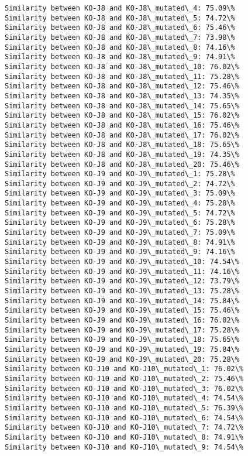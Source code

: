 \documentclass[11pt]{article}
\begin{document}
\begin{Verbatim}[commandchars=\\\{\}]
Similarity between KO-J8 and KO-J8\_mutated\_4: 75.09\%
Similarity between KO-J8 and KO-J8\_mutated\_5: 74.72\%
Similarity between KO-J8 and KO-J8\_mutated\_6: 75.46\%
Similarity between KO-J8 and KO-J8\_mutated\_7: 73.98\%
Similarity between KO-J8 and KO-J8\_mutated\_8: 74.16\%
Similarity between KO-J8 and KO-J8\_mutated\_9: 74.91\%
Similarity between KO-J8 and KO-J8\_mutated\_10: 76.02\%
Similarity between KO-J8 and KO-J8\_mutated\_11: 75.28\%
Similarity between KO-J8 and KO-J8\_mutated\_12: 75.46\%
Similarity between KO-J8 and KO-J8\_mutated\_13: 74.35\%
Similarity between KO-J8 and KO-J8\_mutated\_14: 75.65\%
Similarity between KO-J8 and KO-J8\_mutated\_15: 76.02\%
Similarity between KO-J8 and KO-J8\_mutated\_16: 75.46\%
Similarity between KO-J8 and KO-J8\_mutated\_17: 76.02\%
Similarity between KO-J8 and KO-J8\_mutated\_18: 75.65\%
Similarity between KO-J8 and KO-J8\_mutated\_19: 74.35\%
Similarity between KO-J8 and KO-J8\_mutated\_20: 75.46\%
Similarity between KO-J9 and KO-J9\_mutated\_1: 75.28\%
Similarity between KO-J9 and KO-J9\_mutated\_2: 74.72\%
Similarity between KO-J9 and KO-J9\_mutated\_3: 75.09\%
Similarity between KO-J9 and KO-J9\_mutated\_4: 75.28\%
Similarity between KO-J9 and KO-J9\_mutated\_5: 74.72\%
Similarity between KO-J9 and KO-J9\_mutated\_6: 75.28\%
Similarity between KO-J9 and KO-J9\_mutated\_7: 75.09\%
Similarity between KO-J9 and KO-J9\_mutated\_8: 74.91\%
Similarity between KO-J9 and KO-J9\_mutated\_9: 74.16\%
Similarity between KO-J9 and KO-J9\_mutated\_10: 74.54\%
Similarity between KO-J9 and KO-J9\_mutated\_11: 74.16\%
Similarity between KO-J9 and KO-J9\_mutated\_12: 73.79\%
Similarity between KO-J9 and KO-J9\_mutated\_13: 75.28\%
Similarity between KO-J9 and KO-J9\_mutated\_14: 75.84\%
Similarity between KO-J9 and KO-J9\_mutated\_15: 75.46\%
Similarity between KO-J9 and KO-J9\_mutated\_16: 76.02\%
Similarity between KO-J9 and KO-J9\_mutated\_17: 75.28\%
Similarity between KO-J9 and KO-J9\_mutated\_18: 75.65\%
Similarity between KO-J9 and KO-J9\_mutated\_19: 75.84\%
Similarity between KO-J9 and KO-J9\_mutated\_20: 75.28\%
Similarity between KO-J10 and KO-J10\_mutated\_1: 76.02\%
Similarity between KO-J10 and KO-J10\_mutated\_2: 75.46\%
Similarity between KO-J10 and KO-J10\_mutated\_3: 76.02\%
Similarity between KO-J10 and KO-J10\_mutated\_4: 74.54\%
Similarity between KO-J10 and KO-J10\_mutated\_5: 76.39\%
Similarity between KO-J10 and KO-J10\_mutated\_6: 74.54\%
Similarity between KO-J10 and KO-J10\_mutated\_7: 74.72\%
Similarity between KO-J10 and KO-J10\_mutated\_8: 74.91\%
Similarity between KO-J10 and KO-J10\_mutated\_9: 74.54\%

\end{Verbatim}
\end{document}
